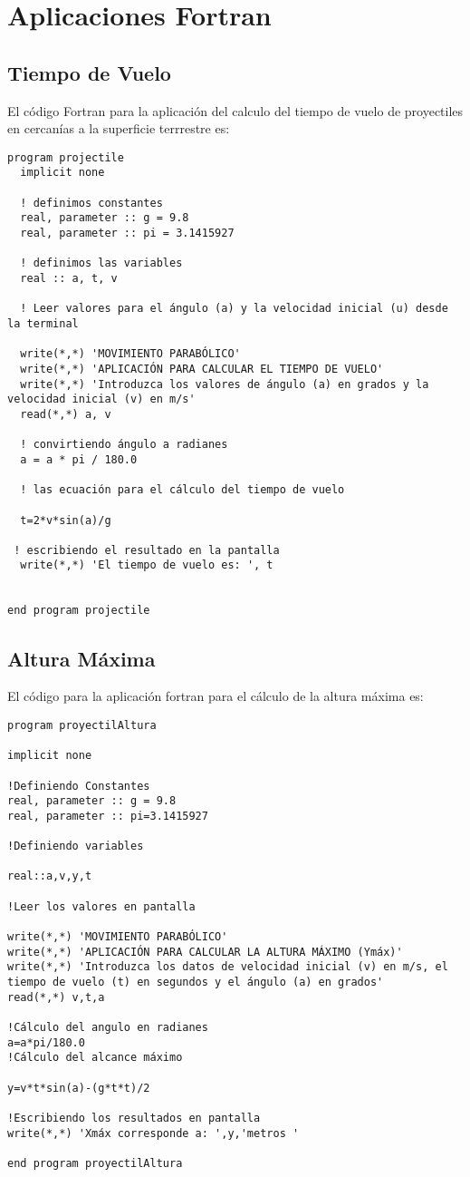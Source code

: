 \documentclass[12pt,a4paper]{article}
\begin{document}
\newpage
{}
\section{Aplicaciones Fortran}
\subsection{Tiempo de Vuelo}
El código Fortran para la aplicación del calculo del tiempo de vuelo de proyectiles en cercanías a la superficie terrrestre es:
\begin{verbatim}
program projectile
  implicit none

  ! definimos constantes
  real, parameter :: g = 9.8
  real, parameter :: pi = 3.1415927

  ! definimos las variables
  real :: a, t, v

  ! Leer valores para el ángulo (a) y la velocidad inicial (u) desde la terminal
  
  write(*,*) 'MOVIMIENTO PARABÓLICO'
  write(*,*) 'APLICACIÓN PARA CALCULAR EL TIEMPO DE VUELO'
  write(*,*) 'Introduzca los valores de ángulo (a) en grados y la velocidad inicial (v) en m/s'
  read(*,*) a, v

  ! convirtiendo ángulo a radianes
  a = a * pi / 180.0
  
  ! las ecuación para el cálculo del tiempo de vuelo

  t=2*v*sin(a)/g
   
 ! escribiendo el resultado en la pantalla
  write(*,*) 'El tiempo de vuelo es: ', t
  

end program projectile

\end{verbatim}
\subsection{Altura Máxima}
El código para la aplicación fortran para el cálculo de la altura máxima es:
\begin{verbatim}
program proyectilAltura

implicit none

!Definiendo Constantes
real, parameter :: g = 9.8
real, parameter :: pi=3.1415927

!Definiendo variables

real::a,v,y,t

!Leer los valores en pantalla

write(*,*) 'MOVIMIENTO PARABÓLICO'
write(*,*) 'APLICACIÓN PARA CALCULAR LA ALTURA MÁXIMO (Ymáx)'
write(*,*) 'Introduzca los datos de velocidad inicial (v) en m/s, el tiempo de vuelo (t) en segundos y el ángulo (a) en grados'
read(*,*) v,t,a

!Cálculo del angulo en radianes
a=a*pi/180.0
!Cálculo del alcance máximo

y=v*t*sin(a)-(g*t*t)/2

!Escribiendo los resultados en pantalla
write(*,*) 'Xmáx corresponde a: ',y,'metros '

end program proyectilAltura

\end{verbatim}
\end{document}
